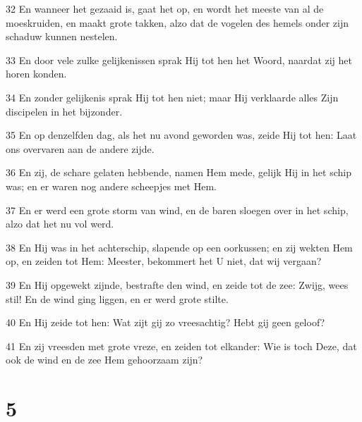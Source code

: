 \par 32 En wanneer het gezaaid is, gaat het op, en wordt het meeste van al de moeskruiden, en maakt grote takken, alzo dat de vogelen des hemels onder zijn schaduw kunnen nestelen.
\par 33 En door vele zulke gelijkenissen sprak Hij tot hen het Woord, naardat zij het horen konden.
\par 34 En zonder gelijkenis sprak Hij tot hen niet; maar Hij verklaarde alles Zijn discipelen in het bijzonder.
\par 35 En op denzelfden dag, als het nu avond geworden was, zeide Hij tot hen: Laat ons overvaren aan de andere zijde.
\par 36 En zij, de schare gelaten hebbende, namen Hem mede, gelijk Hij in het schip was; en er waren nog andere scheepjes met Hem.
\par 37 En er werd een grote storm van wind, en de baren sloegen over in het schip, alzo dat het nu vol werd.
\par 38 En Hij was in het achterschip, slapende op een oorkussen; en zij wekten Hem op, en zeiden tot Hem: Meester, bekommert het U niet, dat wij vergaan?
\par 39 En Hij opgewekt zijnde, bestrafte den wind, en zeide tot de zee: Zwijg, wees stil! En de wind ging liggen, en er werd grote stilte.
\par 40 En Hij zeide tot hen: Wat zijt gij zo vreesachtig? Hebt gij geen geloof?
\par 41 En zij vreesden met grote vreze, en zeiden tot elkander: Wie is toch Deze, dat ook de wind en de zee Hem gehoorzaam zijn?

\chapter{5}

